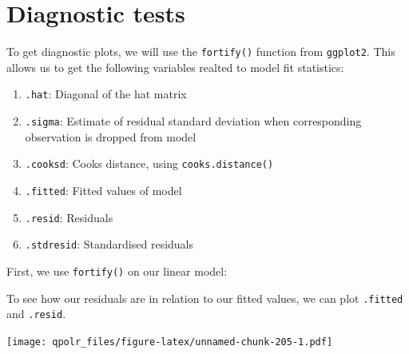 \documentclass[12pt,oneside]{reedthesis}
\providecommand{\tightlist}{%
  \setlength{\itemsep}{0pt}\setlength{\parskip}{0pt}}
\theoremstyle{definition}
\theoremstyle{definition}
\theoremstyle{definition}
\theoremstyle{remark}
\begin{document}
  \section{Diagnostic tests}\label{diagnostic-tests}
  
  To get diagnostic plots, we will use the \texttt{fortify()} function
  from \texttt{ggplot2}. This allows us to get the following variables
  realted to model fit statistics:
  \begin{enumerate}
  \def\labelenumi{\arabic{enumi}.}
  \tightlist
  \item
    \texttt{.hat}: Diagonal of the hat matrix
  \item
    \texttt{.sigma}: Estimate of residual standard deviation when
    corresponding observation is dropped from model
  \item
    \texttt{.cooksd}: Cooks distance, using \texttt{cooks.distance()}
  \item
    \texttt{.fitted}: Fitted values of model
  \item
    \texttt{.resid}: Residuals
  \item
    \texttt{.stdresid}: Standardised residuals
  \end{enumerate}
  First, we use \texttt{fortify()} on our linear model:
  \begin{Shaded}
  \begin{Highlighting}[]
  \StringTok{ }
  \end{Highlighting}
  \end{Shaded}
  To see how our residuals are in relation to our fitted values, we can
  plot \texttt{.fitted} and \texttt{.resid}.
  \begin{Shaded}
  \begin{Highlighting}[]
  \NormalTok{(}\OperatorTok{+}
  \StringTok{  }\NormalTok{() }\OperatorTok{+}
  \StringTok{  }\NormalTok{(} \NormalTok{) }\OperatorTok{+}
  \StringTok{  }\NormalTok{(} \NormalTok{) }\OperatorTok{+}
  \StringTok{  }\NormalTok{(} \NormalTok{,}
          \NormalTok{,}
          \NormalTok{)}
  \end{Highlighting}
  \end{Shaded}
  \texttt{[image: qpolr\_files/figure-latex/unnamed-chunk-205-1.pdf]}
  
\end{document}
